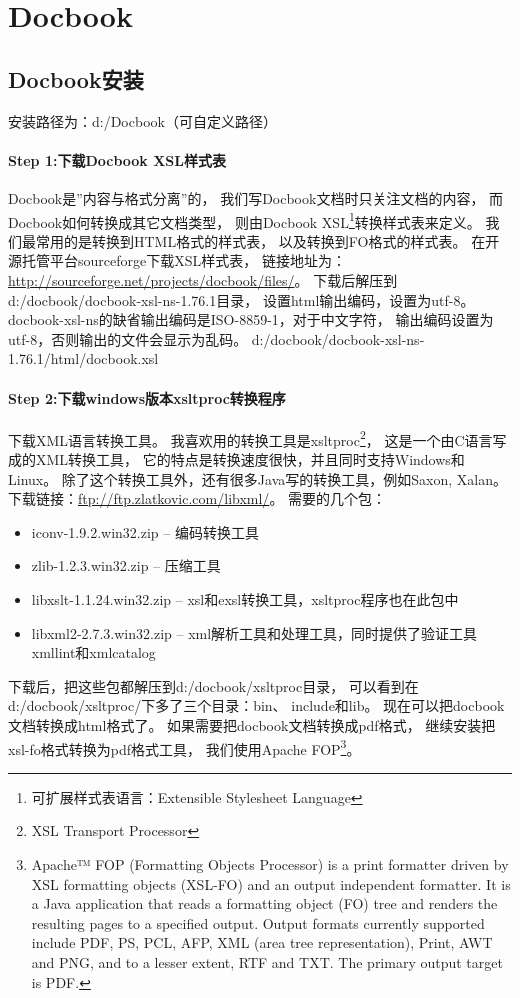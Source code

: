 \documentclass{book}
\begin{document}
\section{Docbook}

\subsection{Docbook安装}

安装路径为：d:/Docbook（可自定义路径）

\paragraph{Step 1:下载Docbook XSL样式表}

Docbook是”内容与格式分离”的，
我们写Docbook文档时只关注文档的内容，
而Docbook如何转换成其它文档类型，
则由Docbook XSL\footnote{可扩展样式表语言：Extensible Stylesheet Language}转换样式表来定义。
我们最常用的是转换到HTML格式的样式表，
以及转换到FO格式的样式表。 
在开源托管平台sourceforge下载XSL样式表，
链接地址为：\url{http://sourceforge.net/projects/docbook/files/}。
下载后解压到d:/docbook/docbook-xsl-ns-1.76.1目录，
设置html输出编码，设置为utf-8。
docbook-xsl-ns的缺省输出编码是ISO-8859-1，对于中文字符，
输出编码设置为utf-8，否则输出的文件会显示为乱码。
d:/docbook/docbook-xsl-ns-1.76.1/html/docbook.xsl

\paragraph{Step 2:下载windows版本xsltproc转换程序}

下载XML语言转换工具。
我喜欢用的转换工具是xsltproc\footnote{XSL Transport Processor}，
这是一个由C语言写成的XML转换工具，
它的特点是转换速度很快，并且同时支持Windows和Linux。
除了这个转换工具外，还有很多Java写的转换工具，例如Saxon, Xalan。 
下载链接：\url{ftp://ftp.zlatkovic.com/libxml/}。
需要的几个包：

\begin{itemize}
\item{iconv-1.9.2.win32.zip – 编码转换工具}
\item{zlib-1.2.3.win32.zip – 压缩工具}
\item{libxslt-1.1.24.win32.zip – xsl和exsl转换工具，xsltproc程序也在此包中}
\item{libxml2-2.7.3.win32.zip – xml解析工具和处理工具，同时提供了验证工具xmllint和xmlcatalog}
\end{itemize}

下载后，把这些包都解压到d:/docbook/xsltproc目录，
可以看到在d:/docbook/xsltproc/下多了三个目录：bin、 include和lib。
现在可以把docbook文档转换成html格式了。
如果需要把docbook文档转换成pdf格式，
继续安装把xsl-fo格式转换为pdf格式工具，
我们使用Apache FOP\footnote{Apache™ FOP (Formatting Objects Processor) 
is a print formatter driven by XSL formatting objects (XSL-FO) and an output independent formatter. 
It is a Java application that reads a formatting object (FO) tree 
and renders the resulting pages to a specified output. 
Output formats currently supported include PDF, PS, 
PCL, AFP, XML (area tree representation), Print, AWT and PNG, 
and to a lesser extent, RTF and TXT. The primary output target is PDF.}。
\end{document}
